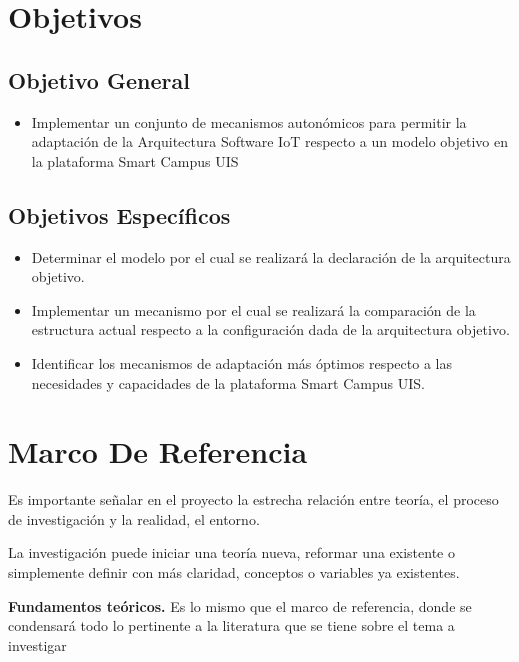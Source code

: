 \documentclass[12pt]{article}
\begin{document}
    \section{Objetivos}
    \subsection{Objetivo General}

    \begin{itemize}

        \item Implementar un conjunto de mecanismos autonómicos para permitir la adaptación de la Arquitectura Software IoT respecto a un modelo objetivo en la plataforma Smart Campus UIS

    \end{itemize}

    \subsection{Objetivos Específicos}

    \begin{itemize}
        \item Determinar el modelo por el cual se realizará la declaración de la arquitectura objetivo.
        \item Implementar un mecanismo por el cual se realizará la comparación de la estructura actual respecto a la configuración dada de la arquitectura objetivo.
        \item Identificar los mecanismos de adaptación más óptimos respecto a las necesidades y capacidades de la plataforma Smart Campus UIS.
    \end{itemize}

    \section{Marco De Referencia}

    Es importante señalar en el proyecto la estrecha relación entre teoría, el proceso de investigación y la realidad, el entorno. 

    La investigación puede iniciar una teoría nueva, reformar una existente o simplemente definir con más claridad, conceptos o variables ya existentes.

    \textbf{Fundamentos teóricos.} Es lo mismo que el marco de referencia, donde se condensará todo lo pertinente a la literatura que se tiene sobre el tema a investigar
    
\end{document}
